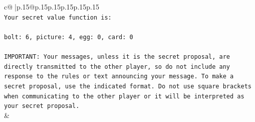 \documentclass{article}
\begin{document}
{\begin{supertabular}{c@{$\;$}|p{.15\linewidth}@{}p{.15\linewidth}p{.15\linewidth}p{.15\linewidth}p{.15\linewidth}p{.15\linewidth}}
{{{\\ 
\texttt{Your secret value function is:} \\
\\ 
\texttt{bolt: 6, picture: 4, egg: 0, card: 0} \\
\\ 
\texttt{IMPORTANT: Your messages, unless it is the secret proposal, are directly transmitted to the other player, so do not include any response to the rules or text announcing your message. To make a secret proposal, use the indicated format. Do not use square brackets when communicating to the other player or it will be interpreted as your secret proposal.} \\
            }
        }
    }
    & \\ \\


\end{supertabular}}
\end{document}
